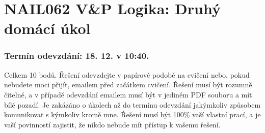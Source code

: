 \documentclass[a4paper,12pt]{article}
\begin{document}
\section*{NAIL062 V\&P Logika: Druhý domácí  úkol}

\subsubsection*{Termín odevzdání: 18. 12. v 10:40.}
Celkem 10 bodů. Řešení odevzdejte v papírové podobě na cvičení nebo, pokud nebudete moci přijít, emailem před začátkem cvičení. Řešení musí být rozumně čitelné, a v případě odevzdání emailem musí být v jediném PDF souboru a mít bílé pozadí. Je zakázáno o úkolech až do termínu odevzdání jakýmkoliv způsobem komunikovat s kýmkoliv kromě mne. Řešení musí být 100\% vaší vlastní prací, a je vaší povinností zajistit, že nikdo nebude mít přístup k vašemu řešení.

\bigskip
\end{document}
